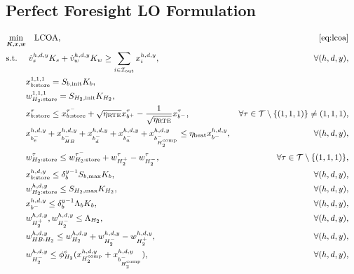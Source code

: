 \documentclass[11pt, letter]{article}
\begin{document}
\subsection{Perfect Foresight LO Formulation}\label{section:lp-formulation}
\begin{subequations}
\small
\begin{align}
\min_{\boldsymbol{K,x,w}} &\quad \text{LCOA},&~\eqref{eq:lcoa} \nonumber \\
\text{s.t.} \quad & \ \dot{v}_s^{h,d,y} K_s + \dot{v}_w^{h,d,y} K_w \ge \sum_{i \in \mathcal{I}_\text{out}} x_{i}^{h,d,y}, & \forall(h,d,y), \label{eq:lp-model-energy-balance}  \\
& x_{b:\text{store}}^{1,1,1} = S_{b,\text{init}} K_b, & \label{eq:lp-model-init-battery} \\
& w_{H_2:\text{store}}^{1,1,1} = S_{H_2,\text{init}} K_{H_2}, & \label{eq:lp-model-init-h2} \\
& x_{b:\text{store}}^{\tau} \le x_{b:\text{store}}^{\tau^-} + \sqrt{\eta_\text{RTE}} x_{b^+}^{\tau}  - \frac{1}{\sqrt{\eta_\text{RTE}}} x_{b^-}^{\tau}, & \forall \tau\in\mathcal{T}\setminus\{(1,1,1)\} \neq (1,1,1), & \label{eq:lp-model-battery-update} \\
& x_{b^-_e}^{h,d,y} + x_{b^-_{HB}}^{h,d,y} + x_{b^-_d}^{h,d,y} + x_{b^-_a}^{h,d,y} + x_{b^-_{H_2^\text{comp}}}^{h,d,y} \le \eta_\text{heat}  x_{b^-}^{h,d,y}, & \forall (h,d,y), \label{eq:lp-model-battery-efficiency} \\
& w_{H_2:\text{store}}^{\tau} \le w_{H_2:\text{store}}^{\tau^-} + w_{H_2^+}^{\tau} - w_{H_2^-}^{\tau}, & \forall \tau\in\mathcal{T}\setminus\{(1,1,1)\}, \label{eq:lp-model-h2-update} \\
& x_{b:\text{store}}^{h,d,y} \le \delta_b^{y-1} S_{b,\text{max}} K_b, & \forall (h,d,y), \label{eq:lp-model-battery-cap} \\
& w_{H_2:\text{store}}^{h,d,y} \le S_{H_2,\text{max}} K_{H_2}, & \forall (h,d,y), \label{eq:lp-model-h2-cap} \\
& x_{b^-}^{h,d,y} \le \delta^{y-1}_b \Lambda_b K_b, & \forall (h,d,y), \label{eq:lp-model-battery-discharge-limit} \\
& w_{H_2^+}^{h,d,y}, w_{H_2^-}^{h,d,y} \le \Lambda_{H_2}, & \forall (h,d,y), \label{eq:lp-model-h2-flowlimit} \\
& w_{HB:H_2}^{h,d,y} \le w_{H_2}^{h,d,y} + w_{H_2^-}^{h,d,y} - w_{H_2^+}^{h,d,y}, & \forall (h,d,y), \label{eq:lp-model-h2-balance-hb} \\
& w_{H_2^-}^{h,d,y} \le \phi_{H_2}^e (x_{H_2^\text{comp}}^{h,d,y} + x_{b^-_{H_2^\text{comp}}}^{h,d,y}), & \forall (h,d,y), \label{eq:lp-model-h2-compression} \\

\end{align}
\end{subequations}
\end{document}
